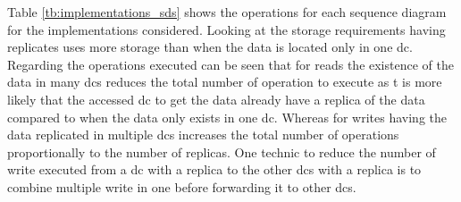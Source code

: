\documentclass{acm_proc_article-sp}
\begin{document}
Table \ref{tb:implementations_sds} shows the operations for each sequence diagram for the implementations considered. Looking at the storage requirements having replicates uses more storage than when the data is located only in one \gls{dc}. Regarding the operations executed can be seen that for reads the existence of the data in many \glspl{dc} reduces the total number of operation to execute as t is more likely that the accessed \gls{dc} to get the data already have a replica of the data compared to when the data only exists in one \gls{dc}. Whereas for writes having the data replicated in multiple \glspl{dc} increases the total number of operations proportionally to the number of replicas. One technic to reduce the number of write executed from a \gls{dc} with a replica to the other \glspl{dc} with a replica is to combine multiple write in one before forwarding it to other \glspl{dc}.
\end{document}
